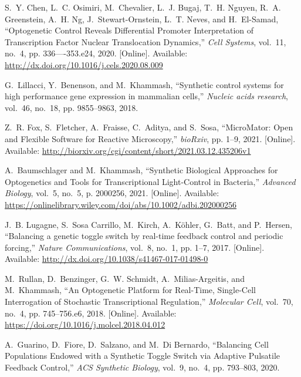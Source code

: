 \documentclass[12pt]{iopart}
\begin{document}
\begin{thebibliography}{10}
\BIBentryALTinterwordspacing
S.~Y. Chen, L.~C. Osimiri, M.~Chevalier, L.~J. Bugaj, T.~H. Nguyen, R.~A.
  Greenstein, A.~H. Ng, J.~Stewart-Ornstein, L.~T. Neves, and H.~El-Samad,
  ``{Optogenetic Control Reveals Differential Promoter Interpretation of
  Transcription Factor Nuclear Translocation Dynamics},'' \emph{Cell Systems},
  vol.~11, no.~4, pp. 336----353.e24, 2020. [Online]. Available:
  \url{http://dx.doi.org/10.1016/j.cels.2020.08.009}
\BIBentrySTDinterwordspacing

G.~Lillacci, Y.~Benenson, and M.~Khammash, ``{Synthetic control systems for
  high performance gene expression in mammalian cells},'' \emph{Nucleic acids
  research}, vol.~46, no.~18, pp. 9855--9863, 2018.

\BIBentryALTinterwordspacing
Z.~R. Fox, S.~Fletcher, A.~Fraisse, C.~Aditya, and S.~Sosa, ``{MicroMator: Open
  and Flexible Software for Reactive Microscopy},'' \emph{bioRxiv}, pp. 1--9,
  2021. [Online]. Available:
  \url{http://biorxiv.org/cgi/content/short/2021.03.12.435206v1}
\BIBentrySTDinterwordspacing

\BIBentryALTinterwordspacing
A.~Baumschlager and M.~Khammash, ``{Synthetic Biological Approaches for
  Optogenetics and Tools for Transcriptional Light-Control in Bacteria},''
  \emph{Advanced Biology}, vol.~5, no.~5, p. 2000256, 2021. [Online].
  Available:
  \url{https://onlinelibrary.wiley.com/doi/abs/10.1002/adbi.202000256}
\BIBentrySTDinterwordspacing

\BIBentryALTinterwordspacing
J.~B. Lugagne, S.~{Sosa Carrillo}, M.~Kirch, A.~K{\"{o}}hler, G.~Batt, and
  P.~Hersen, ``{Balancing a genetic toggle switch by real-time feedback control
  and periodic forcing},'' \emph{Nature Communications}, vol.~8, no.~1, pp.
  1--7, 2017. [Online]. Available:
  \url{http://dx.doi.org/10.1038/s41467-017-01498-0}
\BIBentrySTDinterwordspacing

\BIBentryALTinterwordspacing
M.~Rullan, D.~Benzinger, G.~W. Schmidt, A.~Milias-Argeitis, and M.~Khammash,
  ``{An Optogenetic Platform for Real-Time, Single-Cell Interrogation of
  Stochastic Transcriptional Regulation},'' \emph{Molecular Cell}, vol.~70,
  no.~4, pp. 745--756.e6, 2018. [Online]. Available:
  \url{https://doi.org/10.1016/j.molcel.2018.04.012}
\BIBentrySTDinterwordspacing

A.~Guarino, D.~Fiore, D.~Salzano, and M.~{Di Bernardo}, ``{Balancing Cell
  Populations Endowed with a Synthetic Toggle Switch via Adaptive Pulsatile
  Feedback Control},'' \emph{ACS Synthetic Biology}, vol.~9, no.~4, pp.
  793--803, 2020.


\end{thebibliography}
\end{document}
